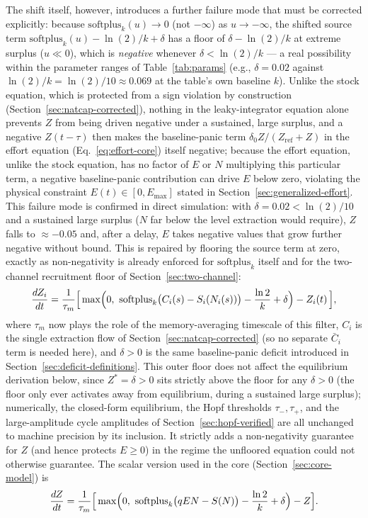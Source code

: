 \documentclass[twocolumn,10pt]{article}
\begin{document}
The shift itself, however, introduces a further failure mode that must be corrected explicitly: because $\text{softplus}_k(u)\to0$ (not $-\infty$) as $u\to-\infty$, the shifted source term $\text{softplus}_k(u)-\ln(2)/k+\delta$ has a floor of $\delta-\ln(2)/k$ at extreme surplus ($u\ll0$), which is \emph{negative} whenever $\delta<\ln(2)/k$ — a real possibility within the parameter ranges of Table~\ref{tab:params} (e.g., $\delta=0.02$ against $\ln(2)/k=\ln(2)/10\approx0.069$ at the table's own baseline $k$). Unlike the stock equation, which is protected from a sign violation by construction (Section~\ref{sec:natcap-corrected}), nothing in the leaky-integrator equation alone prevents $Z$ from being driven negative under a sustained, large surplus, and a negative $Z(t-\tau)$ then makes the baseline-panic term $\delta_0 Z/(Z_{\text{ref}}+Z)$ in the effort equation (Eq.~\eqref{eq:effort-core}) itself negative; because the effort equation, unlike the stock equation, has no factor of $E$ or $N$ multiplying this particular term, a negative baseline-panic contribution can drive $E$ below zero, violating the physical constraint $E(t)\in[0,E_{\max}]$ stated in Section~\ref{sec:generalized-effort}. This failure mode is confirmed in direct simulation: with $\delta=0.02<\ln(2)/10$ and a sustained large surplus ($N$ far below the level extraction would require), $Z$ falls to $\approx-0.05$ and, after a delay, $E$ takes negative values that grow further negative without bound. This is repaired by flooring the source term at zero, exactly as non-negativity is already enforced for $\text{softplus}_k$ itself and for the two-channel recruitment floor of Section~\ref{sec:two-channel}:
\[
\frac{dZ_i}{dt} = \frac{1}{\tau_m}\Bigl[\,\max\Bigl(0,\ \text{softplus}_k\bigl(C_i(s) - S_i(N_i(s))\bigr) - \frac{\ln 2}{k} + \delta\Bigr) - Z_i(t)\,\Bigr],
\]
where $\tau_m$ now plays the role of the memory-averaging timescale of this filter, $C_i$ is the single extraction flow of Section~\ref{sec:natcap-corrected} (so no separate $\bar C_i$ term is needed here), and $\delta>0$ is the same baseline-panic deficit introduced in Section~\ref{sec:deficit-definitions}. This outer floor does not affect the equilibrium derivation below, since $Z^*=\delta>0$ sits strictly above the floor for any $\delta>0$ (the floor only ever activates away from equilibrium, during a sustained large surplus); numerically, the closed-form equilibrium, the Hopf thresholds $\tau_-,\tau_+$, and the large-amplitude cycle amplitudes of Section~\ref{sec:hopf-verified} are all unchanged to machine precision by its inclusion. It strictly adds a non-negativity guarantee for $Z$ (and hence protects $E\ge0$) in the regime the unfloored equation could not otherwise guarantee. The scalar version used in the core (Section~\ref{sec:core-model}) is
\[
\frac{dZ}{dt} = \frac{1}{\tau_m}\Bigl[\,\max\Bigl(0,\ \text{softplus}_k\bigl(qEN - S(N)\bigr) - \frac{\ln 2}{k} + \delta\Bigr) - Z\Bigr].
\]
\end{document}
